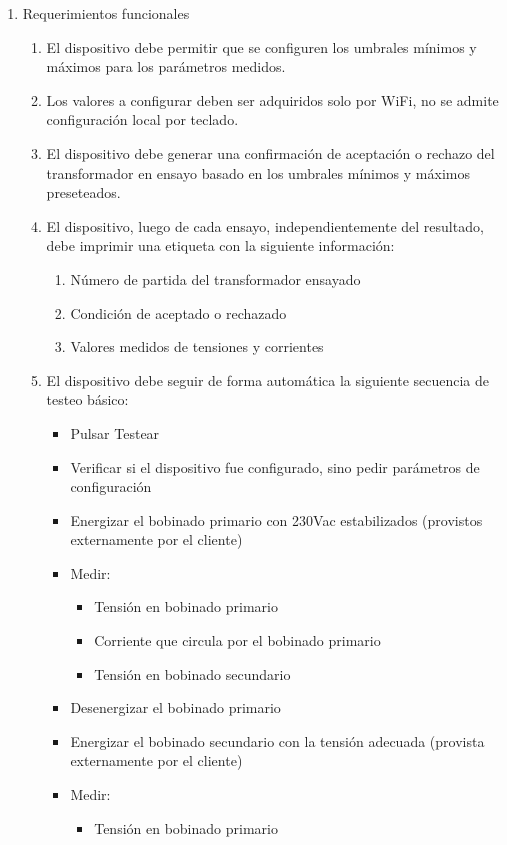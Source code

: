 \documentclass[11pt]{charter}
\begin{document}
\begin{enumerate}
\begin{enumerate}
	\end{enumerate}
\item Requerimientos funcionales
	\begin{enumerate}
	\item El dispositivo debe permitir que se configuren los umbrales mínimos y máximos para los parámetros medidos. 
	\item Los valores a configurar deben ser adquiridos solo por WiFi, no se admite configuración local por teclado.
	\item El dispositivo debe generar una confirmación de aceptación o rechazo del transformador en ensayo basado en los umbrales mínimos y máximos preseteados.
	\item El dispositivo, luego de cada ensayo, independientemente del resultado, debe imprimir una etiqueta con la siguiente información:
		\begin{enumerate}
		\item Número de partida del transformador ensayado
		\item Condición de aceptado o rechazado
		\item Valores medidos de tensiones y corrientes
		\end{enumerate}
	\item El dispositivo debe seguir de forma automática la siguiente secuencia de testeo básico:
		\begin{itemize}
		\item Pulsar Testear
		\item Verificar si el dispositivo fue configurado, sino pedir parámetros de configuración
		\item Energizar el bobinado primario con 230Vac estabilizados  (provistos externamente por el cliente)
		\item Medir:
			\begin{itemize}
			\item Tensión en bobinado primario
			\item Corriente que circula por el bobinado primario
			\item Tensión en bobinado secundario
			\end{itemize}
		\item Desenergizar el bobinado primario
		\item Energizar el bobinado secundario con la tensión adecuada (provista externamente por el cliente)
		\item Medir:
			\begin{itemize}
			\item Tensión en bobinado primario

\end{itemize}
\end{itemize}
\end{enumerate}
\end{enumerate}
\end{document}
